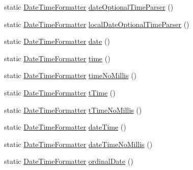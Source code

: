 \begin{DoxyCompactItemize}
\item 
static \hyperlink{classorg_1_1joda_1_1time_1_1format_1_1_date_time_formatter}{Date\-Time\-Formatter} \hyperlink{classorg_1_1joda_1_1time_1_1format_1_1_i_s_o_date_time_format_a1b6e5085612b9d6c374413b3b89e28a3}{date\-Optional\-Time\-Parser} ()
\item 
static \hyperlink{classorg_1_1joda_1_1time_1_1format_1_1_date_time_formatter}{Date\-Time\-Formatter} \hyperlink{classorg_1_1joda_1_1time_1_1format_1_1_i_s_o_date_time_format_a975f7a6ecb799119417a5d59fd3fb7e5}{local\-Date\-Optional\-Time\-Parser} ()
\item 
static \hyperlink{classorg_1_1joda_1_1time_1_1format_1_1_date_time_formatter}{Date\-Time\-Formatter} \hyperlink{classorg_1_1joda_1_1time_1_1format_1_1_i_s_o_date_time_format_ac71af973d15902ba7c4764224cfbb7cb}{date} ()
\item 
static \hyperlink{classorg_1_1joda_1_1time_1_1format_1_1_date_time_formatter}{Date\-Time\-Formatter} \hyperlink{classorg_1_1joda_1_1time_1_1format_1_1_i_s_o_date_time_format_a782141b660556509d76a16a322c74dad}{time} ()
\item 
static \hyperlink{classorg_1_1joda_1_1time_1_1format_1_1_date_time_formatter}{Date\-Time\-Formatter} \hyperlink{classorg_1_1joda_1_1time_1_1format_1_1_i_s_o_date_time_format_ac6d6890320fa86a94db564f1e366bf33}{time\-No\-Millis} ()
\item 
static \hyperlink{classorg_1_1joda_1_1time_1_1format_1_1_date_time_formatter}{Date\-Time\-Formatter} \hyperlink{classorg_1_1joda_1_1time_1_1format_1_1_i_s_o_date_time_format_a6b4700751b93c693895b8127a2835461}{t\-Time} ()
\item 
static \hyperlink{classorg_1_1joda_1_1time_1_1format_1_1_date_time_formatter}{Date\-Time\-Formatter} \hyperlink{classorg_1_1joda_1_1time_1_1format_1_1_i_s_o_date_time_format_ab12e38301ad09c5895be5cc296b3d52f}{t\-Time\-No\-Millis} ()
\item 
static \hyperlink{classorg_1_1joda_1_1time_1_1format_1_1_date_time_formatter}{Date\-Time\-Formatter} \hyperlink{classorg_1_1joda_1_1time_1_1format_1_1_i_s_o_date_time_format_a7d87ac550d9b9641d8b920fc539bb9ce}{date\-Time} ()
\item 
static \hyperlink{classorg_1_1joda_1_1time_1_1format_1_1_date_time_formatter}{Date\-Time\-Formatter} \hyperlink{classorg_1_1joda_1_1time_1_1format_1_1_i_s_o_date_time_format_a560cf8f92451401ef004b5f7f0aa1e8a}{date\-Time\-No\-Millis} ()
\item 
static \hyperlink{classorg_1_1joda_1_1time_1_1format_1_1_date_time_formatter}{Date\-Time\-Formatter} \hyperlink{classorg_1_1joda_1_1time_1_1format_1_1_i_s_o_date_time_format_a7d4048e59113fb133798ca758b14c25a}{ordinal\-Date} ()

\end{DoxyCompactItemize}
